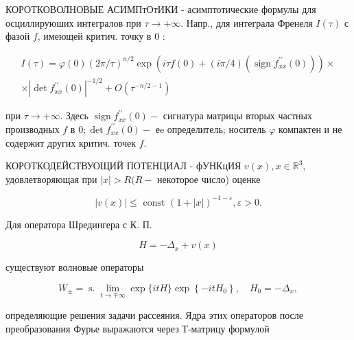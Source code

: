 \documentclass[10pt]{article}
\begin{document}
КОРОТКОВОЛНОВЫЕ АСИМПтОтИКИ - асимптотические формулы для осциллируюших интегралов при $\tau \rightarrow+\infty$. Напр., для интеграла Френеля $I(\tau)$ с фазой $f$, имеющей критич. точку в 0 :



\[

\begin{gathered}

I(\tau)=\varphi(0)(2 \pi / \tau)^{n / 2} \exp \left(i \tau f(0)+(i \pi / 4)\left(\operatorname{sign} f_{x x}^{\prime \prime}(0)\right)\right) \times \\

\times\left|\operatorname{det} f_{x x}^{\prime \prime}(0)\right|^{-1 / 2}+O\left(\tau^{-n / 2-1}\right)

\end{gathered}

\]



при $\tau \rightarrow+\infty$. Здесь $\operatorname{sign} f_{x x}^{\prime \prime}(0)-$ сигнатура матрицы вторых частных производных $f$ в $0 ; \operatorname{det} f_{x x}^{\prime \prime}(0)-$ еe определитель; носитель $\varphi$ компактен и не содержит других критич. точек $f$.



КОРОТКОДЕЙСТВУОЩИЙ ПОТЕНЦИАЛ - фУНКцИЯ $v(x), x \in \mathbb{R}^{3}$, удовлетворяющая при $|x|>R(R-$ некоторое число) оценке



\[

|v(x)| \leqslant \text { const }(1+|x|)^{-1-\varepsilon}, \varepsilon>0 .

\]



Для оператора Шредингера с К. П.



\[

H=-\Delta_{x}+v(x)

\]



существуют волновые операторы



\[

W_{ \pm}=\operatorname{s.} \lim _{t \rightarrow \mp \infty} \exp \{i t H\} \exp \left\{-i t H_{0}\right\}, \quad H_{0}=-\Delta_{x},

\]



определяющие решения задачи рассеяния. Ядра этих операторов после преобразования Фурье выражаются через Т-матрицу формулой
\end{document}
